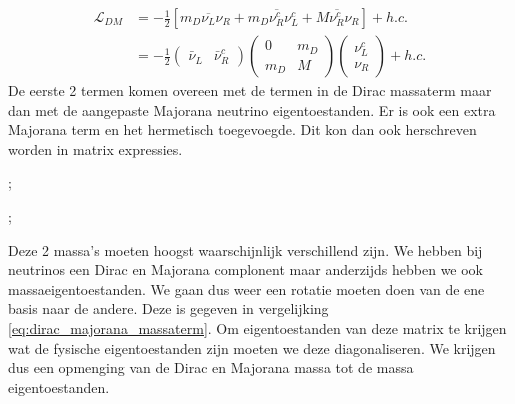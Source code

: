 \documentclass[../main.tex]{subfiles}
\begin{document}
\begin{equation}
    \begin{aligned}
        \label{eq:dirac_majorana_massaterm}
        \mathcal{L}_{D M} &=-\frac{1}{2}\left[m_{D} \overline{\nu_{L}} \nu_{R}+m_{D} \overline{\nu_{R}^{c}} \nu_{L}^{c}+M \overline{\nu_{R}^{c}} \nu_{R}\right]+h . c . \\
                          &=-\frac{1}{2}\left(\begin{array}{cc}
                                  \bar{\nu}_{L} & \bar{\nu}_{R}^{c}
                                  \end{array}\right)\left(\begin{array}{cc}
                                  0 & m_{D} \\
                                  m_{D} & M
                                  \end{array}\right)\left(\begin{array}{c}
                                  \nu_{L}^{c} \\
                                  \nu_{R}
                          \end{array}\right)+h . c .
    \end{aligned}
\end{equation}
De eerste 2 termen komen overeen met de termen in de Dirac massaterm maar dan met de aangepaste Majorana neutrino eigentoestanden. Er is ook een extra Majorana term en het hermetisch toegevoegde. Dit kon dan ook herschreven worden in matrix expressies.\\
\begin{minipage}[c]{0.5\textwidth}
    \begin{center}
        ;
    \end{center}
\end{minipage}\noindent
\begin{minipage}[c]{0.5\textwidth}
    \begin{center}
        ;
    \end{center}
\end{minipage}
Deze 2 massa's moeten hoogst waarschijnlijk verschillend zijn. We hebben bij neutrinos een Dirac en Majorana complonent maar anderzijds hebben we ook massaeigentoestanden. We gaan dus weer een rotatie moeten doen van de ene basis naar de andere. Deze is gegeven in vergelijking \ref{eq:dirac_majorana_massaterm}. Om eigentoestanden van deze matrix te krijgen wat de fysische eigentoestanden zijn moeten we deze diagonaliseren. We krijgen dus een opmenging van de Dirac en Majorana massa tot de massa eigentoestanden.
\end{document}
